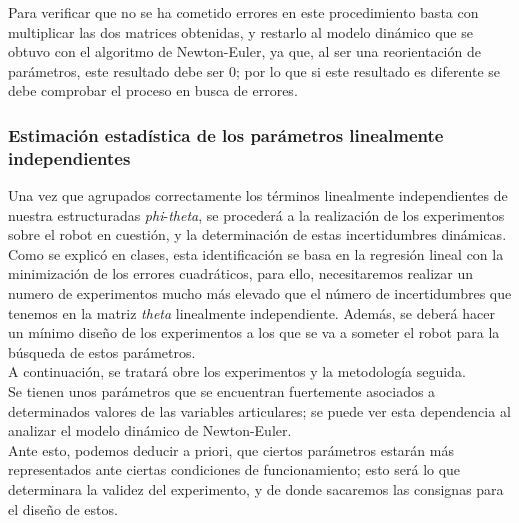 Para verificar que no se ha cometido errores en este procedimiento basta con multiplicar las dos matrices obtenidas, y restarlo al modelo dinámico que se obtuvo con el algoritmo de Newton-Euler, ya que, al ser una reorientación de parámetros, este resultado debe ser 0; por lo que si este resultado es diferente se debe comprobar el proceso en busca de errores.



\subsubsection{Estimación estadística de los parámetros linealmente independientes}

Una vez que agrupados correctamente los términos linealmente independientes de nuestra estructuradas \textit{phi}-\textit{theta}, se procederá a la realización de los experimentos sobre el robot en cuestión, y la determinación de estas incertidumbres dinámicas.\\

Como se explicó en clases, esta identificación se basa en la regresión lineal con la minimización de los
errores cuadráticos, para ello, necesitaremos realizar un numero de experimentos mucho más elevado que el número
de incertidumbres que tenemos en la matriz \textit{theta} linealmente independiente. Además, se deberá hacer
un mínimo diseño de los experimentos a los que se va a someter el robot para la búsqueda de estos parámetros.\\

A continuación, se tratará obre los experimentos y la metodología seguida.\\

Se tienen unos parámetros que se encuentran fuertemente asociados a determinados valores de las variables articulares; se puede ver esta dependencia al analizar el modelo dinámico de Newton-Euler.\\
Ante esto, podemos deducir a priori, que ciertos parámetros estarán más representados ante ciertas condiciones de funcionamiento; esto será lo que determinara la validez del experimento, y de donde sacaremos las consignas para el diseño de estos.\\

